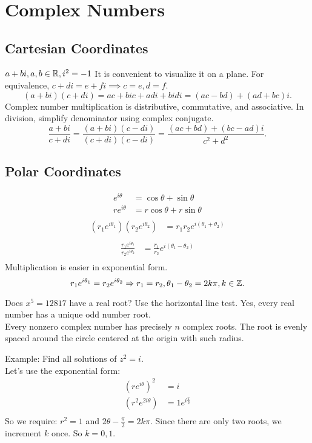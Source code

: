 \documentclass[class=article,crop=false]{standalone}
\begin{document}
\section{Complex Numbers}
\subsection{Cartesian Coordinates}
$a+bi, a,b \in \mathbb{R}, i^2=-1$
It is convenient to visualize it on a plane. 
For equivalence, $c+di=e+fi \implies c=e,d=f$.
 \[
(a+bi)(c+di)=ac+bic+adi+bidi=(ac-bd)+(ad+bc)i
.\]
Complex number multiplication is distributive, commutative, and associative.
In division, simplify denominator using complex conjugate.
\[
	\frac{a+bi }{c+di } = \frac{(a+bi)(c-di)}{(c+di)(c-di)} = \frac{(ac+bd)+(bc-ad)i}{c^2+d^2}	
.\] 
\subsection{Polar Coordinates}
\begin{align*}
	e^{i\theta}&=\cos \theta + \sin \theta\\
		  re^{i\theta} &= r\cos\theta + r\sin\theta \\
\end{align*}
\begin{align*}
	(r_1 e^{i\theta_1})(r_2e^{i\theta_2})&= r_1r_2e^{i(\theta_1+\theta_2)} \\
\end{align*}
\begin{align*}
	\frac{r_1e^{i\theta_1}}{r_2e^{i\theta_2}}&= \frac{r_1}{r_2} e^{i(\theta_1-\theta_2)}\\
\end{align*}
Multiplication is easier in exponential form.
\[
r_1e^{i\theta_1}=r_2e^{i\theta_2} \Rightarrow r_1=r_2, \theta_1-\theta_2=2k\pi, k \in \mathbb{Z}
.\] 

Does $x^{5}=12817$ have a real root? Use the horizontal line test. Yes, every real number has a unique odd number root.\\

Every nonzero complex number has precisely $n$ complex roots. The root is evenly spaced around the circle centered at the origin with such radius.

Example:
Find all solutions of  $z^2=i$.\\
Let's use the exponential form:
\begin{align*}
	\left( re^{i\theta} \right)^2&=i  \\
 \left( r^2e^{2i\theta} \right) &= 1e^{i\frac{\pi}{2}} \\
\end{align*}
So we require: $r^2=1$ and $2\theta-\frac{\pi}{2}=2k\pi$. Since there are only two roots, we increment $k$ once. So $k=0,1$.
\end{document}
